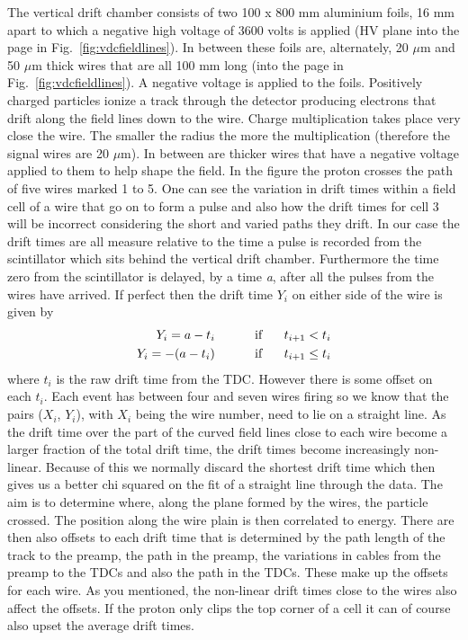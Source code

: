 \documentclass[11pt]{report}
\begin{document}
The vertical drift chamber consists of two 100 x 800 mm aluminium foils, 16 mm apart to which
a negative high voltage of 3600 volts is applied (HV plane into the page in Fig.~\ref{fig:vdcfieldlines}). 
In between these foils are, alternately, 20 $\mu$m and 50 $\mu$m thick wires that are all 100 mm long (into the page
in Fig.~\ref{fig:vdcfieldlines}). A negative voltage is applied to the foils. Positively charged particles ionize a
track through the detector producing electrons that drift along the field lines down to the wire.
Charge multiplication takes place very close the wire. The smaller the radius the more the
multiplication (therefore the signal wires are 20 $\mu$m). In between are thicker wires that have a
negative voltage applied to them to help shape the field. In the figure the proton crosses the
path of five wires marked 1 to 5. One can see the variation in drift times within a field cell of a
wire that go on to form a pulse and also how the drift times for cell 3 will be incorrect
considering the short and varied paths they drift.
In our case the drift times are all measure relative to the time a pulse is recorded from the
scintillator which sits behind the vertical drift chamber. Furthermore the time zero from the
scintillator is delayed, by a time {\it a}, after all the pulses from the wires have arrived. If perfect
then the drift time $Y_i$ on either side of the wire is given by
\begin{eqnarray}
Y_i = a - t_i         \hspace{1cm}  \textrm{   if  }  \hspace{0.5cm}  t_{i+1} < t_i     \\
Y_i = -(a - t_i)      \hspace{1cm}  \textrm{   if  }  \hspace{0.5cm}  t_{i+1} \le t_i
\end{eqnarray}
where $t_i$ is the raw drift time from the TDC. However there is some offset on each $t_i$. Each event
has between four and seven wires firing so we know that the pairs ($X_i$, $Y_i$), with $X_i$ being the wire
number, need to lie on a straight line. As the drift time over the part of the curved field lines
close to each wire become a larger fraction of the total drift time, the drift times become
increasingly non-linear. Because of this we normally discard the shortest drift time which then
gives us a better chi squared on the fit of a straight line through the data. The aim is to
determine where, along the plane formed by the wires, the particle crossed. The position along
the wire plain is then correlated to energy.
There are then also offsets to each drift time that is determined by the path length of the track
to the preamp, the path in the preamp, the variations in cables from the preamp to the TDCs
and also the path in the TDCs. These make up the offsets for each wire. As you mentioned, the
non-linear drift times close to the wires also affect the offsets. If the proton only clips the top
corner of a cell it can of course also upset the average drift times.
\end{document}
